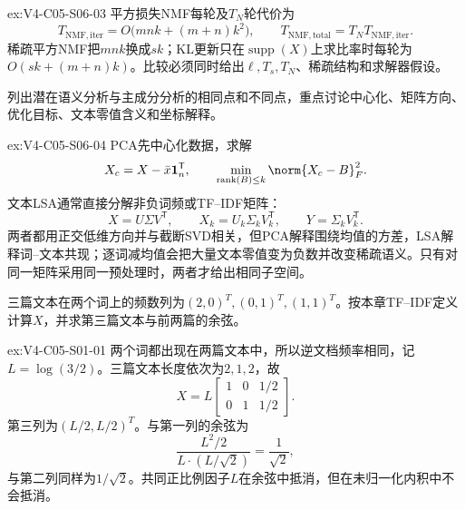 \begin{SLChapterExercisePairSection}
\begin{chapterexercisesolution}{ex:V4-C05-S06-03}
平方损失NMF每轮及$T_N$轮代价为
\[
T_{\mathrm{NMF,iter}}
=O\bigl(mnk+(m+n)k^2\bigr),
\qquad
T_{\mathrm{NMF,total}}=T_NT_{\mathrm{NMF,iter}}.
\]
稀疏平方NMF把$mnk$换成$sk$；KL更新只在$\operatorname{supp}(X)$上求比率时每轮为$O(sk+(m+n)k)$。比较必须同时给出$\ell,T_s,T_N$、稀疏结构和求解器假设。
\end{chapterexercisesolution}
\fi

\begin{exercise}\label{ex:V4-C05-S06-04}
列出潜在语义分析与主成分分析的相同点和不同点，重点讨论中心化、矩阵方向、优化目标、文本零值含义和坐标解释。
\end{exercise}
\ifSLFullEdition
{}\label{sol:V4-C05-S06-04}
\begin{chapterexercisesolution}{ex:V4-C05-S06-04}
PCA先中心化数据，求解
\[
X_c=X-\bar x\mathbf1_n^{\mathsf T},
\qquad
\min_{\operatorname{rank}(B)\le k}\norm{X_c-B}_F^2.
\]
文本LSA通常直接分解非负词频或TF--IDF矩阵：
\[
X=U\Sigma V^{\mathsf T},
\qquad
X_k=U_k\Sigma_kV_k^{\mathsf T},
\qquad
Y=\Sigma_kV_k^{\mathsf T}.
\]
两者都用正交低维方向并与截断SVD相关，但PCA解释围绕均值的方差，LSA解释词--文本共现；逐词减均值会把大量文本零值变为负数并改变稀疏语义。只有对同一矩阵采用同一预处理时，两者才给出相同子空间。
\end{chapterexercisesolution}
\fi

\begin{exercise}\label{ex:V4-C05-S01-01}
三篇文本在两个词上的频数列为$(2,0)^T,(0,1)^T,(1,1)^T$。按本章TF--IDF定义计算$X$，并求第三篇文本与前两篇的余弦。
\end{exercise}
\ifSLFullEdition
{}\label{sol:V4-C05-S01-01}
\begin{chapterexercisesolution}{ex:V4-C05-S01-01}
两个词都出现在两篇文本中，所以逆文档频率相同，记
$L=\log(3/2)$。三篇文本长度依次为$2,1,2$，故
\[
X=L\begin{bmatrix}1&0&1/2\\0&1&1/2\end{bmatrix}.
\]
第三列为$(L/2,L/2)^T$。与第一列的余弦为
\[
\frac{L^2/2}{L\cdot(L/\sqrt2)}=\frac1{\sqrt2},
\]
与第二列同样为$1/\sqrt2$。共同正比例因子$L$在余弦中抵消，但在未归一化内积中不会抵消。
\end{chapterexercisesolution}
\fi


\end{SLChapterExercisePairSection}
